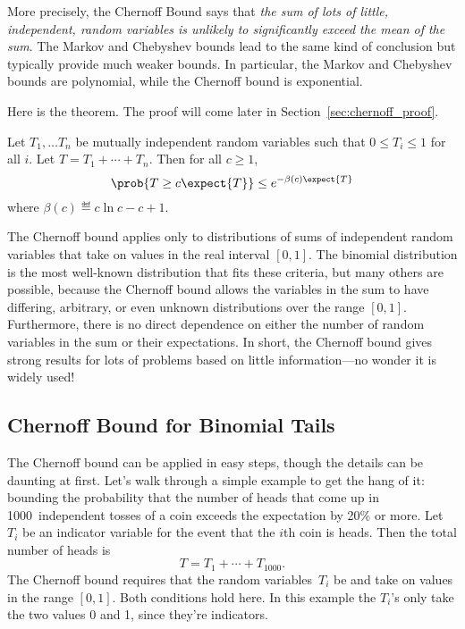 More precisely, the Chernoff Bound says that \emph{the sum of lots of
  little, independent, random variables is unlikely to significantly
  exceed the mean of the sum}.  The Markov and Chebyshev bounds lead
to the same kind of conclusion but typically provide much weaker
bounds.  In particular, the Markov and Chebyshev bounds are
polynomial, while the Chernoff bound is exponential.

Here is the theorem.  The proof will come later in
Section~\ref{sec:chernoff_proof}.

\begin{theorem}
\label{thm:chernoff}
Let $T_1, \dots T_n$ be mutually independent random variables such
that $0 \leq T_i \leq 1$ for all $i$.  Let $T = T_1 + \cdots + T_n$.
Then for all $c \geq 1$,
\begin{equation}\label{chernoff-leq}
\prob{T \geq c \expect{T}} \leq e^{-\beta(c) \expect{T}}
\end{equation}
where $\beta(c) \eqdef c \ln c - c + 1$.
\end{theorem}

The Chernoff bound applies only to distributions of sums of
independent random variables that take on values in the real interval $[0,
  1]$.  The binomial distribution is the most well-known distribution
that fits these criteria, but many others are possible, because the
Chernoff bound allows the variables in the sum to have differing,
arbitrary, or even unknown distributions over the range $[0, 1]$.
Furthermore, there is no direct dependence on either the number of
random variables in the sum or their expectations.  In short, the
Chernoff bound gives strong results for lots of problems based on
little information---no wonder it is widely used!

\subsection{Chernoff Bound for Binomial Tails}

The Chernoff bound can be applied in easy steps, though the details
can be daunting at first.  Let's walk through a simple example to get
the hang of it: bounding the probability that the number of heads that
come up in 1000~independent tosses of a coin exceeds the expectation
by 20\% or more.  Let $T_i$ be an indicator variable for the event
that the $i$th coin is heads.  Then the total number of heads is
\begin{equation*}
    T = T_1 + \cdots + T_{1000}.
\end{equation*}
The Chernoff bound requires that the random variables~$T_i$ be
 and take on values in the range $[0, 1]$.
Both conditions hold here.  In this example the $T_i$'s only take the two
values 0 and 1, since they're indicators.

